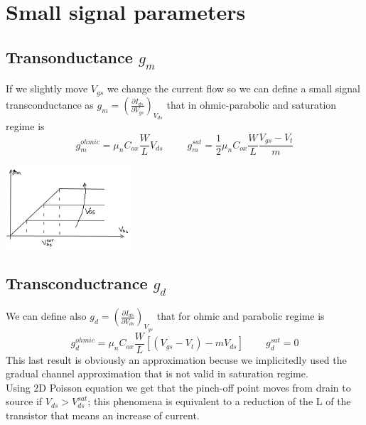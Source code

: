 \section{Small signal parameters}

\subsection{Transonductance $g_m$}
If we slightly move $V_{gs}$ we change the current flow so we can define a small signal transconductance as $g_m=\left(\frac{\partial I_{ds}}{\partial V_{gs}}\right)_{V_{ds}}$ that in ohmic-parabolic and saturation regime is
\begin{equation}
g_m^{ohmic}=\mu_nC_{ox}\frac{W}{L}V_{ds} \ \ \ \ \ \ \ \ \ \ \  g_m^{sat}=\frac{1}{2}\mu_nC_{ox}\frac{W}{L}\frac{V_{gs}-V_t}{m}
\end{equation} 

\centering
\includegraphics[width=0.35\textwidth]{gmmos.png}\\
\raggedright

\subsection{Transconductrance $g_d$}
We can define also $g_d=\left(\frac{\partial I_{ds}}{\partial V_{ds}}\right)_{V_{gs}}$ that for ohmic and parabolic regime is
\begin{equation}
g_d^{ohmic}=\mu_nC_{ox}\frac{W}{L}[(V_{gs}-V_t)-mV_{ds}] \ \ \ \ \ \ \ \ \ \ g_d^{sat}=0
\end{equation}
This last result is obviously an approximation becuse we implicitedly used the gradual channel approximation that is not valid in saturation regime.\\
Using 2D Poisson equation we get that the pinch-off point moves from drain to source if $V_{ds}>V_{ds}^{sat}$; this phenomena is equivalent to a reduction of the L of the transistor that means an increase of current.\\

